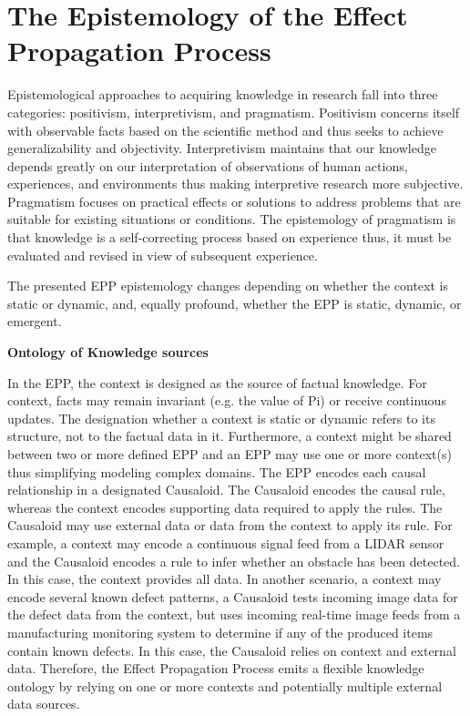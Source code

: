\section{The Epistemology of the Effect Propagation Process}
\label{sec:epp_epistemology}

Epistemological approaches to acquiring knowledge in research fall into three categories: positivism, interpretivism, and pragmatism. Positivism concerns itself with observable facts based on the scientific method and thus seeks to achieve generalizability and objectivity. Interpretivism maintains that our knowledge depends greatly on our interpretation of observations of human actions, experiences, and environments thus making interpretive research more subjective. Pragmatism focuses on practical effects or solutions to address problems that are suitable for existing situations or conditions. The epistemology of pragmatism is that knowledge is a self-correcting process based on experience thus, it must be evaluated and revised in view of subsequent experience.

The  presented EPP epistemology changes depending on whether the context is static or dynamic, and, equally profound, whether the EPP is static, dynamic, or emergent.

\textbf{Ontology of Knowledge sources}

In the EPP, the context is designed as the source of factual knowledge. For context, facts may remain invariant (e.g. the value of Pi) or receive continuous updates. The designation whether a context is static or dynamic refers to its structure, not to the factual data in it. Furthermore, a context might be shared between two or more defined EPP and an EPP may use one or more context(s) thus simplifying modeling complex domains.
The EPP encodes each causal relationship in a designated Causaloid. The Causaloid encodes the causal rule, whereas the context encodes supporting data required to apply the rules. The Causaloid may use external data or data from the context to apply its rule.
For example, a context may encode a continuous signal feed from a LIDAR sensor and the Causaloid encodes a rule to infer whether an obstacle has been detected. In this case, the context provides all data. In another scenario, a context may encode several known defect patterns, a Causaloid tests incoming image data for the defect data from the context, but uses incoming real-time image feeds from a manufacturing monitoring system to determine if any of the produced items contain known defects. In this case, the Causaloid relies on context and external data. Therefore, the Effect Propagation Process emits a flexible knowledge ontology by relying on one or more contexts and potentially multiple external data sources.

